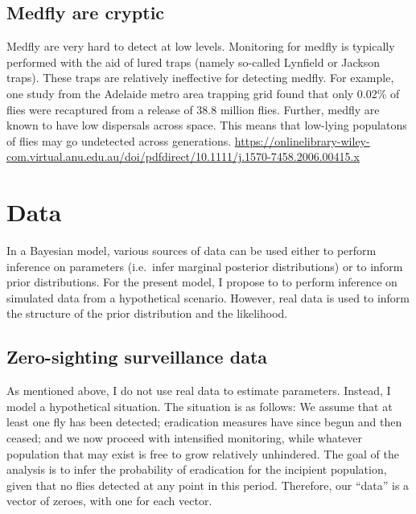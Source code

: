 \documentclass[
  oneside]{book}
\begin{document}
\hypertarget{medfly-are-cryptic}{%
\subsection{Medfly are cryptic}\label{medfly-are-cryptic}}

Medfly are very hard to detect at low levels. Monitoring for medfly is typically performed with the aid of lured traps (namely so-called Lynfield or Jackson traps). These traps are relatively ineffective for detecting medfly. For example, one study from the Adelaide metro area trapping grid found that only 0.02\% of flies were recaptured from a release of 38.8 million flies. Further, medfly are known to have low dispersals across space. This means that low-lying populatons of flies may go undetected across generations. \url{https://onlinelibrary-wiley-com.virtual.anu.edu.au/doi/pdfdirect/10.1111/j.1570-7458.2006.00415.x}

\hypertarget{data}{%
\section{Data}\label{data}}

In a Bayesian model, various sources of data can be used either to perform inference on parameters (i.e.~infer marginal posterior distributions) or to inform prior distributions. For the present model, I propose to to perform inference on simulated data from a hypothetical scenario. However, real data is used to inform the structure of the prior distribution and the likelihood.

\hypertarget{zero-sighting-surveillance-data}{%
\subsection{Zero-sighting surveillance data}\label{zero-sighting-surveillance-data}}

As mentioned above, I do not use real data to estimate parameters. Instead, I model a hypothetical situation. The situation is as follows: We assume that at least one fly has been detected; eradication measures have since begun and then ceased; and we now proceed with intensified monitoring, while whatever population that may exist is free to grow relatively unhindered. The goal of the analysis is to infer the probability of eradication for the incipient population, given that no flies detected at any point in this period. Therefore, our ``data'' is a vector of zeroes, with one for each vector.
\end{document}
